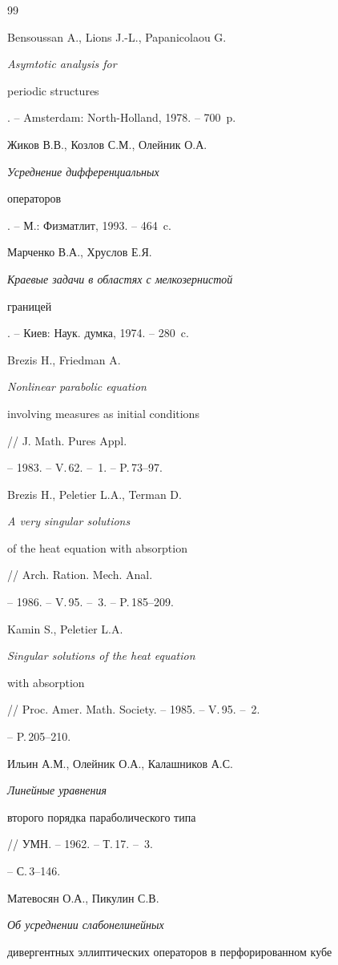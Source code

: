 \begin{thebibliography}{99}







Bensoussan A., Lions J.-L., Papanicolaou G. {\it Asymtotic analysis for


periodic structures}. -- Amsterdam: North-Holland, 1978. -- 700~p.




Жиков В.В., Козлов С.М., Олейник О.А. {\it Усреднение дифференциальных


операторов}. -- М.: Физматлит, 1993. -- 464~c.




Марченко В.А., Хруслов Е.Я. {\it Краевые задачи в областях с мелкозернистой


границей}. -- Киев: Наук. думка, 1974. -- 280~c.




Brezis H., Friedman A. {\it Nonlinear parabolic equation


involving measures as initial conditions} // J. Math. Pures Appl.


-- 1983. -- V.\,62. -- \No\,1. -- P.\,73--97.




Brezis H., Peletier L.A., Terman D. {\it A very singular solutions


of the heat equation with absorption} // Arch. Ration. Mech. Anal.


-- 1986. -- V.\,95. -- \No\,3. -- P.\,185--209.




Kamin S., Peletier L.A. {\it Singular solutions of the heat equation


with absorption} // Proc. Amer. Math. Society. -- 1985. -- V.\,95. -- \No\,2.


-- P.\,205--210.




Ильин А.М., Олейник О.А., Калашников А.С. {\it Линейные уравнения


второго порядка параболического типа} // УМН. -- 1962. -- Т.\,17. -- \No\,3.


-- С.\,3--146.




Матевосян О.А., Пикулин С.В. {\it Об усреднении слабонелинейных


дивергентных эллиптических операторов в перфорированном кубе}



\end{thebibliography}

